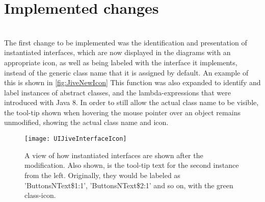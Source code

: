 \section{Implemented changes}\label{jiveImpl}%
~\\

The first change to be implemented was the identification and presentation of instantiated interfaces, which are now displayed in the diagrams with an appropriate icon, as well as being labeled with the interface it implements, instead of the generic class name that it is assigned by default.
An example of this is shown in \autoref{fig:JiveNewIcon}
This function was also expanded to identify and label instances of abstract classes, and the lambda-expressions that were introduced with Java 8.
In order to still allow the actual class name to be visible, the tool-tip shown when hovering the mouse pointer over an object remains unmodified, showing the actual class name and icon.
\begin{figure}[H]
	\centering
	\texttt{[image: UIJiveInterfaceIcon]}
	\caption[A view of how instantiated interfaces are shown after the modification.]{A view of how instantiated interfaces are shown after the modification. Also shown, is the tool-tip text for the second instance from the left. Originally, they would be labeled as 'ButtonsNText\$1:1', 'ButtonsNText\$2:1' and so on, with the green class-icon.}
	\label{fig:JiveNewIcon}
\end{figure}
~\\

